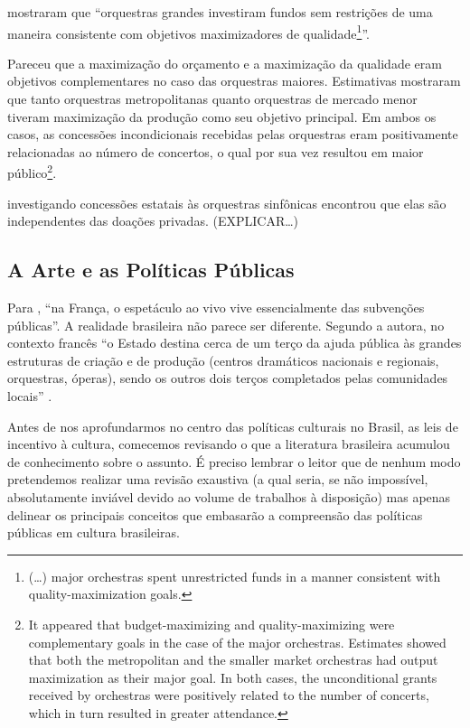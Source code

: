 \documentclass[a4paper, 12pt, openright, oneside, german, french, english, brazil]{abntex2}
\begin{document}
	 mostraram que ``orquestras grandes investiram fundos sem restrições de uma maneira consistente com objetivos maximizadores de qualidade\footnote{(\dots) major orchestras spent unrestricted funds in a manner consistent with quality-maximization goals.}''.
	
	\begin{citacao}
		Pareceu que a maximização do orçamento e a maximização da qualidade eram objetivos complementares no caso das orquestras maiores. Estimativas mostraram que tanto orquestras metropolitanas quanto orquestras de mercado menor tiveram maximização da produção como seu objetivo principal. Em ambos os casos, as concessões incondicionais recebidas pelas orquestras eram positivamente relacionadas ao número de concertos, o qual por sua vez resultou em maior público\footnote{It appeared that budget-maximizing and quality-maximizing were complementary goals in the case of the major orchestras. Estimates showed that both the metropolitan and the smaller market orchestras had output maximization as their major goal. In both cases, the unconditional grants received by orchestras were positively related to the number of concerts, which in turn resulted in greater attendance.}. \cite[p. 323]{luksetich2011orchestras}
	\end{citacao}
	
	 investigando concessões estatais às orquestras sinfônicas encontrou que elas são independentes das doações privadas. (EXPLICAR\ldots)
	
	
	
	
	
	
	\subsection{A Arte e as Políticas Públicas}
	
	Para , ``na França, o espetáculo ao vivo vive essencialmente das subvenções públicas''. A realidade brasileira não parece ser diferente. Segundo a autora, no contexto francês ``o Estado destina cerca de um terço da ajuda pública às grandes estruturas de criação e de produção (centros dramáticos nacionais e regionais, orquestras, óperas), sendo os outros dois terços completados pelas comunidades locais'' \cite[p. 62]{benhamou2007economia}.
	
	Antes de nos aprofundarmos no centro das políticas culturais no Brasil, as leis de incentivo à cultura, comecemos revisando o que a literatura brasileira acumulou de conhecimento sobre o assunto. É preciso lembrar o leitor que de nenhum modo pretendemos realizar uma revisão exaustiva (a qual seria, se não impossível, absolutamente inviável devido ao volume de trabalhos à disposição) mas apenas delinear os principais conceitos que embasarão a compreensão das políticas públicas em cultura brasileiras.
	
\end{document}
